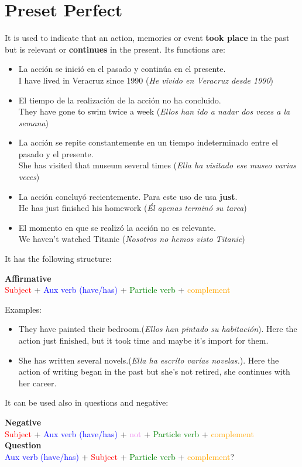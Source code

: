 \documentclass[
	12pt, %
	fleqn, %
	a4paper, %
]{LegrandOrangeBook}
\begin{document}
\section{Preset Perfect}
It is used to indicate that an action, memories or event \textbf{took place} in the past but is relevant or \textbf{continues} in the present. Its functions are:
\begin{itemize}
\item La acción se inició en el pasado y continúa en el presente.\\
I have lived in Veracruz since 1990 (\textit{He vivido en Veracruz desde 1990})
\item El tiempo de la realización de la acción no ha concluido.\\
They have gone to swim twice a week (\textit{Ellos han ido a nadar dos veces a la semana})
\item La acción se repite constantemente en un tiempo indeterminado entre el pasado y el presente.\\
She has visited that museum several times (\textit{Ella ha visitado ese museo varias veces})
\item La acción concluyó recientemente. Para este uso de usa \textbf{just}.\\
He has just finished his homework (\textit{Él apenas terminó su tarea})
\item El momento en que se realizó la acción no es relevante.\\
We haven’t watched Titanic (\textit{Nosotros no hemos visto Titanic})
\end{itemize}
It has the following structure:
\begin{center}
{\large\textbf{Affirmative}\\\textcolor{red}{Subject} + \textcolor{blue}{Aux verb (have/has)} + \textcolor{green}{Particle verb} + \textcolor{orange}{complement}}
\end{center}
Examples:
\begin{itemize}
\item They have painted their bedroom.(\textit{Ellos han pintado su habitación}). Here the action just finished, but it took time and maybe it's import for them.
\item She has written several novels.(\textit{Ella ha escríto varías novelas.}). Here the action of writing began in the past but she's not retired, she continues with her career.
\end{itemize}
It can be used also in questions and negative:
\begin{center}
{\large\textbf{Negative}\\\textcolor{red}{Subject} + \textcolor{blue}{Aux verb (have/has)} + \textcolor{violet}{not} + \textcolor{green}{Particle verb} + \textcolor{orange}{complement}\\
\textbf{Question}\\\textcolor{blue}{Aux verb (have/has)} + \textcolor{red}{Subject} + \textcolor{green}{Particle verb} + \textcolor{orange}{complement}?}
\end{center}
\end{document}
